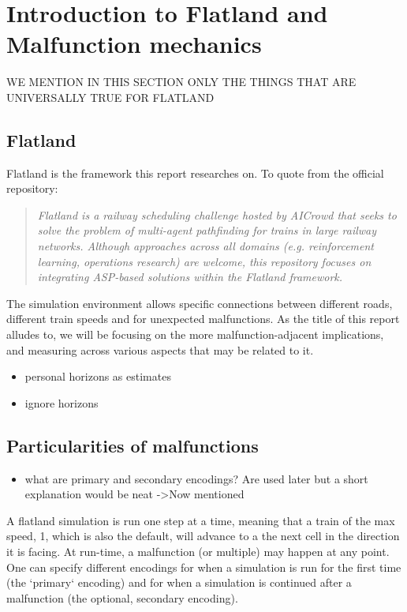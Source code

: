 \section{Introduction to Flatland and Malfunction mechanics}
\color{red} WE MENTION IN THIS SECTION ONLY THE THINGS THAT ARE UNIVERSALLY TRUE FOR FLATLAND \color{black}
\subsection{Flatland}
Flatland\cite{flatland} is the framework this report researches on. To quote from the official repository:
\begin{quote}
\emph{	Flatland is a railway scheduling challenge hosted by AICrowd that seeks to solve the problem of multi-agent pathfinding for trains in large railway networks. Although approaches across all domains (e.g. reinforcement learning, operations research) are welcome, this repository focuses on integrating ASP-based solutions within the Flatland framework.}
\end{quote}

The simulation environment allows specific connections between different roads, different train speeds and for unexpected malfunctions. As the title of this report alludes to, we will be focusing on the more malfunction-adjacent implications, and measuring across various aspects that may be related to it.

\color{green}
\begin{itemize}
	\item personal horizons as estimates
	\item ignore horizons
\end{itemize}
\color{black}

\subsection{Particularities of malfunctions}
\color{green}
\begin{itemize}
	\item what are primary and secondary encodings? Are used later but a short explanation would be neat \color{red} ->Now mentioned
\end{itemize}
\color{black}
A flatland simulation is run one step at a time, meaning that a train of the max speed, 1, which is also the default, will advance to a the next cell in the direction it is facing. At run-time, a malfunction (or multiple) may happen at any point. One can specify different encodings for when a simulation is run for the first time (the `primary` encoding) and for when a simulation is continued after a malfunction (the optional, secondary encoding).


